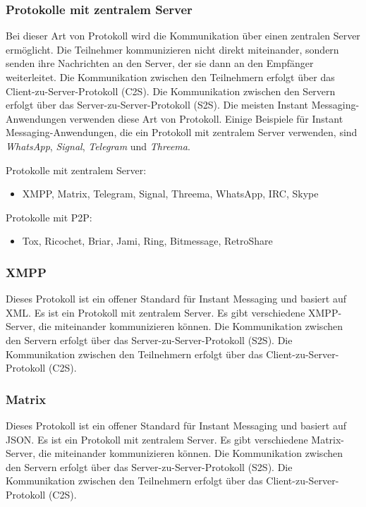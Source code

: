 \subsubsection{Protokolle mit zentralem Server}
Bei dieser Art von Protokoll wird die Kommunikation über einen zentralen Server ermöglicht. Die Teilnehmer kommunizieren nicht direkt miteinander, sondern senden ihre Nachrichten an den Server, der sie dann an den Empfänger weiterleitet. Die Kommunikation zwischen den Teilnehmern erfolgt über das Client-zu-Server-Protokoll (C2S). Die Kommunikation zwischen den Servern erfolgt über das Server-zu-Server-Protokoll (S2S). Die meisten Instant Messaging-Anwendungen verwenden diese Art von Protokoll. Einige Beispiele für Instant Messaging-Anwendungen, die ein Protokoll mit zentralem Server verwenden, sind \textit{WhatsApp}, \textit{Signal}, \textit{Telegram} und \textit{Threema}.



Protokolle mit zentralem Server:

\begin{itemize}
    \item XMPP, Matrix, Telegram, Signal, Threema, WhatsApp, IRC, Skype
\end{itemize}

Protokolle mit P2P:

\begin{itemize}
    \item Tox, Ricochet, Briar, Jami, Ring, Bitmessage, RetroShare
\end{itemize}

\subsubsection{XMPP}
Dieses Protokoll ist ein offener Standard für Instant Messaging und basiert auf XML. Es ist ein
Protokoll mit zentralem Server. Es gibt verschiedene XMPP-Server, die miteinander kommunizieren
können. Die Kommunikation zwischen den Servern erfolgt über das Server-zu-Server-Protokoll (S2S).
Die Kommunikation zwischen den Teilnehmern erfolgt über das Client-zu-Server-Protokoll (C2S).

\subsubsection{Matrix}
Dieses Protokoll ist ein offener Standard für Instant Messaging und basiert auf JSON. Es ist ein
Protokoll mit zentralem Server. Es gibt verschiedene Matrix-Server, die miteinander kommunizieren
können. Die Kommunikation zwischen den Servern erfolgt über das Server-zu-Server-Protokoll (S2S).
Die Kommunikation zwischen den Teilnehmern erfolgt über das Client-zu-Server-Protokoll (C2S).

